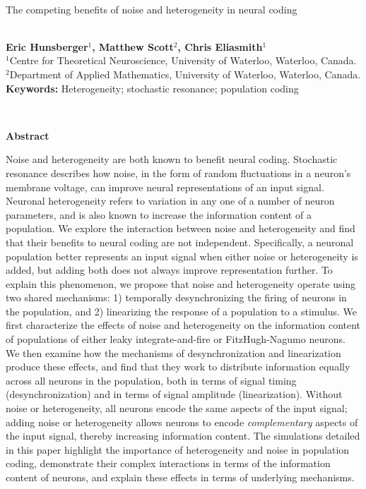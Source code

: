 \documentclass[12pt]{article}
\begin{document}
\hspace{13.9cm}

\ \vspace{20mm}\\

{\LARGE The competing benefits of noise and heterogeneity in neural coding}

\ \\
{\bf \large Eric Hunsberger$^{\displaystyle 1}$, Matthew Scott$^{\displaystyle 2}$, Chris Eliasmith$^{\displaystyle 1}$}\\
{$^{\displaystyle 1}$Centre for Theoretical Neuroscience, University of Waterloo, Waterloo, Canada.}\\
{$^{\displaystyle 2}$Department of Applied Mathematics, University of Waterloo, Waterloo, Canada.}\\
%

{\bf Keywords:} Heterogeneity; stochastic resonance; population coding

\thispagestyle{empty}
%
\ \vspace{-0mm}\\
%
\begin{center} {\bf Abstract} \end{center}

Noise and heterogeneity are both known to benefit neural coding.
Stochastic resonance describes how noise,
in the form of random fluctuations in a neuron's membrane voltage,
can improve neural representations of an input signal.
Neuronal heterogeneity refers to variation in any one of a number of neuron parameters,
and is also known to increase the information content of a population.
We explore the interaction between noise and heterogeneity
and find that their benefits to neural coding are not independent.
Specifically, a neuronal population better represents an input signal
when either noise or heterogeneity is added,
but adding both does not always improve representation further.
To explain this phenomenon, we propose
that noise and heterogeneity operate using two shared mechanisms:
1) temporally desynchronizing the firing of neurons in the population,
and 2) linearizing the response of a population to a stimulus.
We first characterize the effects of noise and heterogeneity
on the information content of populations of
either leaky integrate-and-fire or FitzHugh-Nagumo neurons.
We then examine how the mechanisms
of desynchronization and linearization produce these effects,
and find that they work to distribute information equally across all neurons in the population,
both in terms of signal timing (desynchronization) and in terms of signal amplitude (linearization).
Without noise or heterogeneity,
all neurons encode the same aspects of the input signal;
adding noise or heterogeneity allows neurons
to encode \emph{complementary} aspects of the input signal,
thereby increasing information content.
The simulations detailed in this paper
highlight the importance of heterogeneity and noise in population coding,
demonstrate their complex interactions in terms of the information content of neurons,
and explain these effects in terms of underlying mechanisms.
\end{document}
